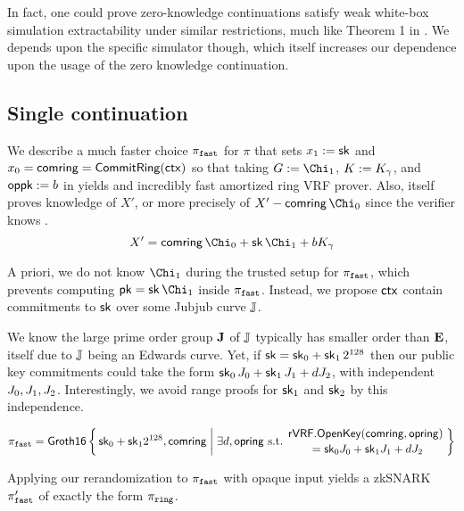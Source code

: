 
In fact, one could prove zero-knowledge continuations satisfy
weak white-box simulation extractability under similar restrictions,
much like Theorem 1 in \cite[\S3, pp. 8 \& 11]{RandomizationGroth16}.
We depends upon the specific simulator though, which itself increases
our dependence upon the usage of the zero knowledge continuation.


\subsection{Single continuation}
\label{subsec:rvrf_faster}

We describe a much faster choice $\pi_{\mathtt{fast}}$ for $\pi$
that sets $x_1 := \mathsf{sk}$ and $x_0 = \mathsf{comring} = {\mathsf{CommitRing}}(\mathsf{ctx})$ so that
taking $\genG := \Chi_1$, $K := K_\gamma$, and $\mathsf{oppk} := b$ in \PedVRF
yields and incredibly fast amortized ring VRF prover.
Also, \PedVRF itself proves knowledge of $X'$,
 or more precisely of $X' - \comring\, \Chi_0$ since the verifier knows \comring.
$$ X' = \comring\, \Chi_0 + \sk\, \Chi_1 + b \genB_\gamma $$


A priori, we do not know $\Chi_1$ during the trusted setup for $\pi_{\mathtt{fast}}$,
which prevents computing $\pk = \sk\, \Chi_1$ inside $\pi_{\mathtt{fast}}$.
Instead, we propose $\mathsf{ctx}$ contain commitments to $\mathsf{sk}$ over
some Jubjub curve ${\mathbb{J}}$.  

We know the large prime order group ${\mathbf{J}}$ of ${\mathbb{J}}$ typically has
smaller order than ${\mathbf{E}}$, itself due to ${\mathbb{J}}$ being an Edwards curve. 
Yet, if $\mathsf{sk} = \mathsf{sk}_0 + \mathsf{sk}_1 \, 2^{128}$ then our public key commitments could
take the form $\mathsf{sk}_0\, J_0 + \mathsf{sk}_1\, J_1 + d J_2$,
with independent $J_0,J_1,J_2$.
Interestingly, we avoid range proofs for $\mathsf{sk}_1$ and $\mathsf{sk}_2$
by this independence. 

$$ \pifast = \rrSNARK \Setst{ \sk_0 + \sk_1 2^{128}, \comring }{
 \exists d,\openring \textrm{\ s.t.\ }
 \genfrac{}{}{0pt}{}{ \rVRF.\OpenKey(\comring,\openring) }{ \,\, = \sk_0 \genJ_0 + \sk_1 \genJ_1 + d \genJ_2 }
} $$ %

Applying our rerandomization to $\pi_{\mathtt{fast}}$ with opaque input yields
a zkSNARK $\pi_{\mathtt{fast}}'$ of exactly the form $\pi_{\mathtt{ring}}$.

